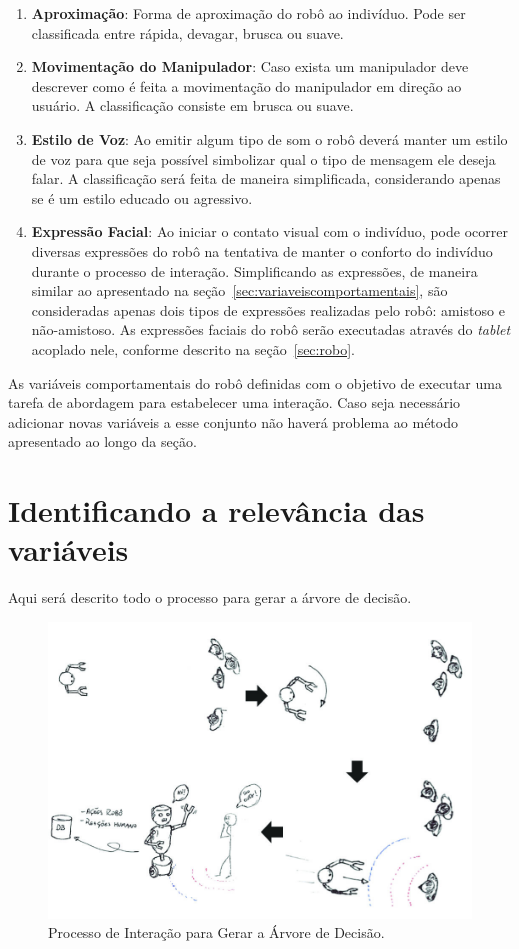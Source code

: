 \begin{enumerate}
	\item \textbf{Aproximação}: Forma de aproximação do robô ao indivíduo. Pode ser classificada entre rápida, devagar, brusca ou suave.
	\item \textbf{Movimentação do Manipulador}: Caso exista um manipulador deve descrever como é feita a movimentação do manipulador em direção ao usuário. A classificação consiste em brusca ou suave.
	\item \textbf{Estilo de Voz}: Ao emitir algum tipo de som o robô deverá manter um estilo de voz para que seja possível simbolizar qual o tipo de mensagem ele deseja falar. A classificação será feita de maneira simplificada, considerando apenas se é um estilo educado ou agressivo.
	\item \textbf{Expressão Facial}: Ao iniciar o contato visual com o indivíduo, pode ocorrer diversas expressões do robô na tentativa de manter o conforto do indivíduo durante o processo de interação. Simplificando as expressões, de maneira similar ao apresentado na seção~\ref{sec:variaveiscomportamentais}, são consideradas apenas dois tipos de expressões realizadas pelo robô: amistoso e não-amistoso. As expressões faciais do robô serão executadas através do \emph{tablet} acoplado nele, conforme descrito na seção~\ref{sec:robo}.
\end{enumerate}

As variáveis comportamentais do robô definidas com o objetivo de executar uma tarefa de abordagem para estabelecer uma interação. Caso seja necessário adicionar novas variáveis a esse conjunto não haverá problema ao método apresentado ao longo da seção.

\section{Identificando a relevância das variáveis}
\label{sec:decisiontree}

Aqui será descrito todo o processo para gerar a árvore de decisão.

\begin{figure}[ht!]
	\centering
	\includegraphics[width=\textwidth]{images/decision_tree_process.jpg}
	\caption{Processo de Interação para Gerar a Árvore de Decisão.}
	\label{fig:rbc}
\end{figure}
